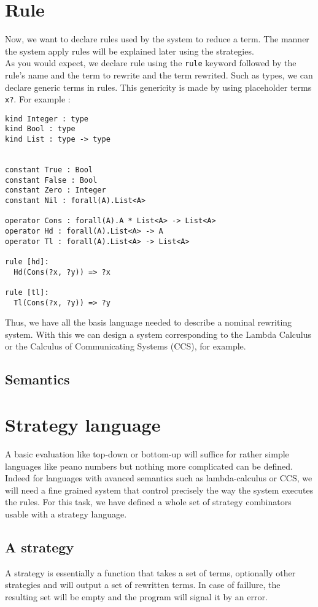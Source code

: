 \documentclass[12pt,a4paper]{article}
\begin{document}
\section{Rule}
Now, we want to declare rules used by the system to reduce a term.
The manner the system apply rules will be explained later using the
strategies.\\
As you would expect, we declare rule using the \verb?rule? keyword
followed by the rule's name and the term to rewrite and the term
rewrited. Such as types, we can declare generic terms in rules. This
genericity is made by using placeholder terms \verb!x?!. For example :
\begin{verbatim}
kind Integer : type
kind Bool : type
kind List : type -> type


constant True : Bool
constant False : Bool
constant Zero : Integer
constant Nil : forall(A).List<A>

operator Cons : forall(A).A * List<A> -> List<A>
operator Hd : forall(A).List<A> -> A
operator Tl : forall(A).List<A> -> List<A>

rule [hd]:
  Hd(Cons(?x, ?y)) => ?x

rule [tl]:
  Tl(Cons(?x, ?y)) => ?y
\end{verbatim}


Thus, we have all the basis language needed to describe a nominal
rewriting system. With this we can design a system
corresponding to the Lambda Calculus or the Calculus of Communicating
Systems (CCS), for example.

\subsection{Semantics}

\section{Strategy language}

A basic evaluation like top-down or bottom-up will suffice for rather simple
languages like peano numbers but nothing more complicated can be defined.
Indeed for languages with avanced semantics such as lambda-calculus or CCS, we 
will need a fine grained system that control precisely the way the system 
executes the rules. For this task, we have defined a whole set of strategy 
combinators usable with a strategy language.

\subsection{A strategy}
A strategy is essentially a function that takes a set of terms, optionally other
strategies and will output a set of rewritten terms. In case of faillure, the 
resulting set will be empty and the program will signal it by an error.
\end{document}
